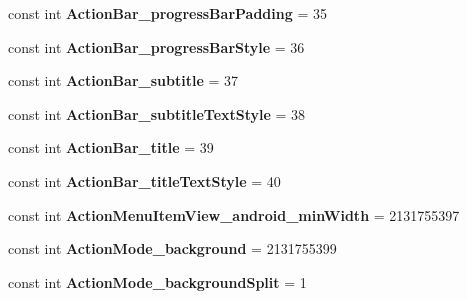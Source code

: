 \begin{DoxyCompactItemize}
const int {\bfseries Action\+Bar\+\_\+progress\+Bar\+Padding} = 35
\item 
\mbox{\label{classst_delivery_1_1_resource_1_1_styleable_a8eedb43814e466a8f2d3c1d9e14a0853}} 
const int {\bfseries Action\+Bar\+\_\+progress\+Bar\+Style} = 36
\item 
\mbox{\label{classst_delivery_1_1_resource_1_1_styleable_a0c2b8ed0163e51ca1397b425b363a4dc}} 
const int {\bfseries Action\+Bar\+\_\+subtitle} = 37
\item 
\mbox{\label{classst_delivery_1_1_resource_1_1_styleable_ac685360b6f14bd03941b5877df1c65cc}} 
const int {\bfseries Action\+Bar\+\_\+subtitle\+Text\+Style} = 38
\item 
\mbox{\label{classst_delivery_1_1_resource_1_1_styleable_afca628ea74b9340421c7e7251b940ae6}} 
const int {\bfseries Action\+Bar\+\_\+title} = 39
\item 
\mbox{\label{classst_delivery_1_1_resource_1_1_styleable_afa91ae93bdd15a93801f71d903cf8f6f}} 
const int {\bfseries Action\+Bar\+\_\+title\+Text\+Style} = 40
\item 
\mbox{\label{classst_delivery_1_1_resource_1_1_styleable_a3e4e7a06b46a8b78fcec316b90a25771}} 
const int {\bfseries Action\+Menu\+Item\+View\+\_\+android\+\_\+min\+Width} = 2131755397
\item 
\mbox{\label{classst_delivery_1_1_resource_1_1_styleable_ac5b8d211c7b5dc3c057465f02fb0d3e1}} 
const int {\bfseries Action\+Mode\+\_\+background} = 2131755399
\item 
\mbox{\label{classst_delivery_1_1_resource_1_1_styleable_ab1fc39fadf20e36b0bffc6d1de445b32}} 
const int {\bfseries Action\+Mode\+\_\+background\+Split} = 1
\item 
\mbox{\label{classst_delivery_1_1_resource_1_1_styleable_a363efc37ecd741b0b3b9ec02bb238565}} 

\end{DoxyCompactItemize}
